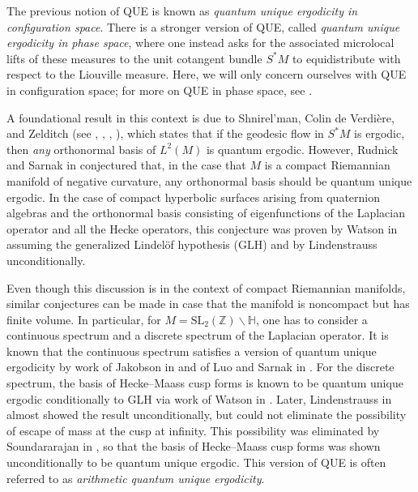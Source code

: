 \documentclass[11pt]{amsart}
\theoremstyle{definition}
\begin{document}
The previous notion of QUE is known as \textit{quantum unique ergodicity in configuration space}. There is a stronger version of QUE, called \textit{quantum unique ergodicity in phase space}, where one instead asks for the associated microlocal lifts of these measures to the unit cotangent bundle $S^{*}M$ to equidistribute with respect to the Liouville measure. Here, we will only concern ourselves with QUE in configuration space; for more on QUE in phase space, see \cite{SarnakProgressQUE}.

A foundational result in this context is due to Shnirel'man, Colin de Verdière, and Zelditch (see \cite{ShnirelmanQE}, \cite{deVerdiere85}, \cite{ZelditchQE}, \cite{Shnirelman1993}), which states that if the geodesic flow in $S^{*}M$ is ergodic, then \textit{any} orthonormal basis of $L^2(M)$ is quantum ergodic. However, Rudnick and Sarnak in \cite{RudnickSarnakQUE} conjectured that, in the case that $M$ is a compact Riemannian manifold of negative curvature, any orthonormal basis should be quantum unique ergodic. In the case of compact hyperbolic surfaces arising from quaternion algebras and the orthonormal basis consisting of eigenfunctions of the Laplacian operator and all the Hecke operators, this conjecture was proven by Watson in \cite[\S 4.2]{WatsonPhD} assuming the generalized Lindelöf hypothesis (GLH) and by Lindenstrauss \cite[Thm.~1.4]{LindenstraussQUE} unconditionally.

Even though this discussion is in the context of compact Riemannian manifolds, similar conjectures can be made in case that the manifold is noncompact but has finite volume. In particular, for $M=\mathrm{SL}_{2}(\mathbb{Z}) \backslash \mathbb{H}$, one has to consider a continuous spectrum and a discrete spectrum of the Laplacian operator. It is known that the continuous spectrum satisfies a version of quantum unique ergodicity by work of Jakobson in \cite{JakobsonQUEEisenstein} and of Luo and Sarnak in \cite{LuoSarnakQUE}. For the discrete spectrum, the basis of Hecke--Maass cusp forms is known to be quantum unique ergodic conditionally to GLH via work of Watson in \cite[\S 4.2]{WatsonPhD}. Later, Lindenstrauss in \cite{LindenstraussQUE} almost showed the result unconditionally, but could not eliminate the possibility of escape of mass at the cusp at infinity. This possibility was eliminated by Soundararajan in \cite{SoundQUE}, so that the basis of Hecke--Maass cusp forms was shown unconditionally to be quantum unique ergodic. This version of QUE is often referred to as \textit{arithmetic quantum unique ergodicity}. 
\end{document}
